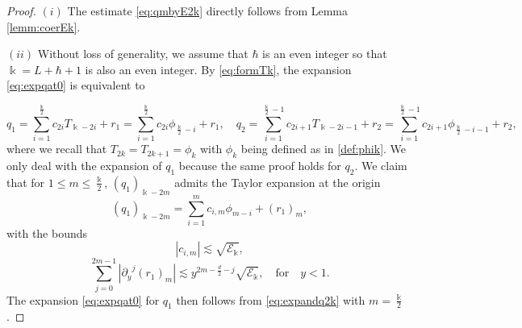 \documentclass[11pt]{aims}
\theoremstyle{definition}
\numberwithin{equation}{section}
\begin{document}
\begin{proof} $(i)$ The estimate \eqref{eq:qmbyE2k} directly follows from Lemma \ref{lemm:coerEk}. 

$(ii)$ Without loss of generality, we assume that $\hbar$ is an even integer so that $\Bbbk = L + \hbar + 1$ is also an even integer. By \eqref{eq:formTk}, the expansion \eqref{eq:expqat0} is equivalent to

\begin{equation}\label{eq:expanq1q2at0}
q_1 = \sum_{i = 1}^{\frac{\Bbbk}{2}}c_{2i}T_{\Bbbk - 2i} + r_1= \sum_{i = 1}^{\frac{\Bbbk}{2}}c_{2i}\phi_{\frac{\Bbbk}{2} - i} + r_1 , \quad q_2 = \sum_{i = 1}^{\frac{\Bbbk}{2} - 1}c_{2i+1}T_{\Bbbk - 2i - 1} + r_2=\sum_{i = 1}^{\frac{\Bbbk}{2} - 1}c_{2i+1}\phi_{\frac \Bbbk 2 - i - 1} + r_2,
\end{equation}
where we recall that $T_{2k} = T_{2k + 1} = \phi_k$ with $\phi_k$ being defined as in \eqref{def:phik}. We only deal with the expansion of $q_1$ because the same proof holds for $q_2$.  We claim that for $1 \leq m \leq \frac{\Bbbk}{2}$, $(q_1)_{\Bbbk - 2m}$ admits the Taylor expansion at the origin
\begin{equation}\label{eq:expandq2k}
(q_1)_{\Bbbk - 2m} = \sum_{i = 1}^{m} c_{i,m}\phi_{m - i} + (r_1)_{m},
\end{equation}
with the bounds 
$$|c_{i,m}| \lesssim \sqrt{{\mathscr{E}}_{\Bbbk}},$$
$$\sum_{j = 0}^{2m-1}|{\partial_y}^j (r_1)_{m}| \lesssim y^{2m - \frac{d}{2} - j}\sqrt{{\mathscr{E}}_{\Bbbk}}, \quad \text{for}  \quad y < 1.$$
The expansion \eqref{eq:expqat0} for $q_1$ then follows from \eqref{eq:expandq2k} with $m = \frac{\Bbbk}{2}$.


\end{proof}
\end{document}
